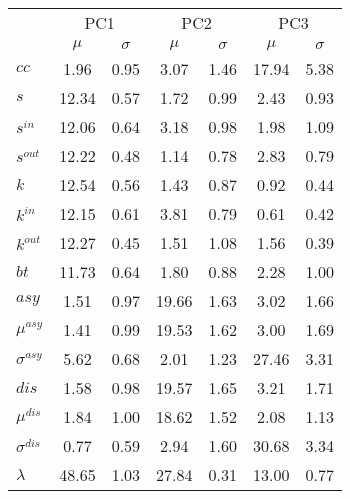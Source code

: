 \begin{center}
\begin{tabular}{| l | c | c | c | c | c | c |}\cline{2-7}
\multicolumn{1}{c|}{} & \multicolumn{2}{c|}{PC1}          & \multicolumn{2}{c|}{PC2} & \multicolumn{2}{c|}{PC3}  \\\cline{2-7}\multicolumn{1}{c|}{} & $\mu$            & $\sigma$ & $\mu$         & $\sigma$ & $\mu$ & $\sigma$  \\\hline
$cc$ & 1.96  & 0.95  & 3.07  & 1.46  & 17.94  & 5.38 \\\hline
$s$ & 12.34  & 0.57  & 1.72  & 0.99  & 2.43  & 0.93 \\
$s^{in}$ & 12.06  & 0.64  & 3.18  & 0.98  & 1.98  & 1.09 \\
$s^{out}$ & 12.22  & 0.48  & 1.14  & 0.78  & 2.83  & 0.79 \\
$k$ & 12.54  & 0.56  & 1.43  & 0.87  & 0.92  & 0.44 \\
$k^{in}$ & 12.15  & 0.61  & 3.81  & 0.79  & 0.61  & 0.42 \\
$k^{out}$ & 12.27  & 0.45  & 1.51  & 1.08  & 1.56  & 0.39 \\
$bt$ & 11.73  & 0.64  & 1.80  & 0.88  & 2.28  & 1.00 \\\hline
$asy$ & 1.51  & 0.97  & 19.66  & 1.63  & 3.02  & 1.66 \\
$\mu^{asy}$ & 1.41  & 0.99  & 19.53  & 1.62  & 3.00  & 1.69 \\
$\sigma^{asy}$ & 5.62  & 0.68  & 2.01  & 1.23  & 27.46  & 3.31 \\
$dis$ & 1.58  & 0.98  & 19.57  & 1.65  & 3.21  & 1.71 \\
$\mu^{dis}$ & 1.84  & 1.00  & 18.62  & 1.52  & 2.08  & 1.13 \\
$\sigma^{dis}$ & 0.77  & 0.59  & 2.94  & 1.60  & 30.68  & 3.34 \\
$\lambda$ & 48.65  & 1.03  & 27.84  & 0.31  & 13.00  & 0.77 \\
\hline\end{tabular}
\end{center}
